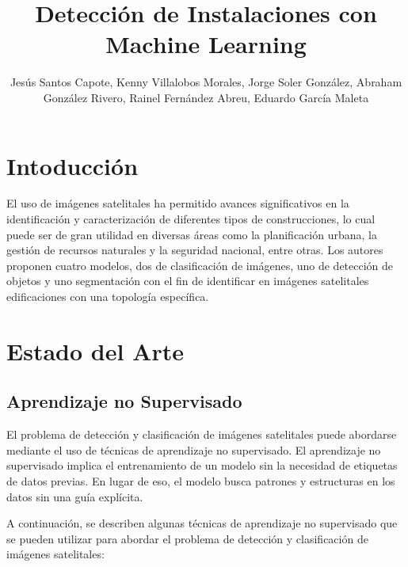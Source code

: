 \documentclass[article]{llncs}
\begin{document}
%
\title{Detecci\'on de Instalaciones con Machine Learning}
%
%
\author{Jes\'us Santos Capote, Kenny Villalobos Morales, Jorge Soler Gonz\'alez, Abraham Gonz\'alez Rivero, 
Rainel Fern\'andez Abreu, Eduardo Garc\'ia Maleta}
%
%
\maketitle              %
%



\section{Intoducci\'on}
El uso de imágenes satelitales ha permitido avances significativos en la identificación y caracterización de diferentes 
tipos de construcciones, lo cual puede ser de gran utilidad en diversas áreas como la planificación urbana, la gestión de 
recursos naturales y la seguridad nacional, entre otras. Los autores proponen cuatro modelos, dos de clasificación de im\'agenes, 
uno de detección de objetos y uno segmentaci\'on con el fin de identificar en im\'agenes satelitales edificaciones con una topolog\'ia espec\'ifica.

\section{Estado del Arte}

\subsection{Aprendizaje no Supervisado}

El problema de detección y clasificación de imágenes satelitales puede abordarse mediante el uso de técnicas de 
aprendizaje no supervisado. El aprendizaje no supervisado implica el entrenamiento de un modelo sin la necesidad de 
etiquetas de datos previas. En lugar de eso, el modelo busca patrones y estructuras en los datos sin una guía explícita.

A continuación, se describen algunas técnicas de aprendizaje no supervisado que se pueden utilizar para abordar el 
problema de detección y clasificación de imágenes satelitales:
\end{document}
